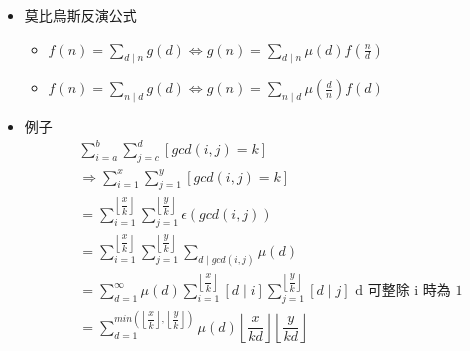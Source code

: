 \begin{itemize}
\item 莫比烏斯反演公式
    \begin{itemize}
        \item $f(n)=\sum_{d\mid n}g(d)\Leftrightarrow g(n)=\sum_{d\mid n}\mu(d)f(\frac{n}{d})$
        \item $f(n)=\sum_{n\mid d}g(d)\Leftrightarrow g(n)=\sum_{n\mid d}\mu(\frac{d}{n})f(d)$
    \end{itemize}

\item 例子
$$ \begin{aligned}
    &\sum_{i = a}^{b} \sum_{j = c}^{d} [gcd(i, j) = k]\\
    &\Rightarrow \sum_{i = 1}^{x} \sum_{j = 1}^{y} [gcd(i, j) = k]\\
    &= \sum_{i = 1}^{\left\lfloor\dfrac {x}{k} \right\rfloor} \sum_{j = 1}^{\left\lfloor\dfrac {y}{k} \right\rfloor} \epsilon(gcd(i, j))\\
    &= \sum_{i = 1}^{\left\lfloor\dfrac {x}{k} \right\rfloor} \sum_{j = 1}^{\left\lfloor\dfrac {y}{k} \right\rfloor} \sum_{d \mid gcd(i, j)} \mu(d)\\
    &= \sum_{d = 1}^{\infty} \mu(d) \sum_{i = 1}^{\left\lfloor\dfrac {x}{k} \right\rfloor} [d \mid i] \sum_{j = 1}^{\left\lfloor\dfrac {y}{k} \right\rfloor} [d \mid j] \text{\ \ d 可整除 i 時為 1}\\
    &= \sum_{d = 1}^{min(\left\lfloor\dfrac {x}{k} \right\rfloor, \left\lfloor\dfrac {y}{k} \right\rfloor)} \mu(d) \left\lfloor\dfrac {x}{kd} \right\rfloor \left\lfloor\dfrac {y}{kd} \right\rfloor
\end{aligned} $$
\end{itemize}